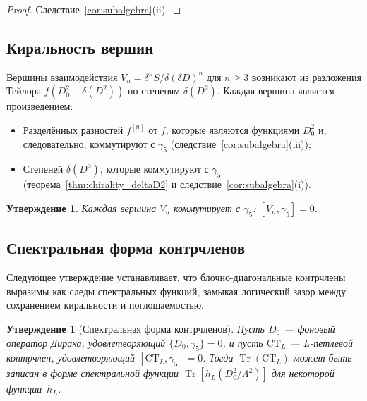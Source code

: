 \documentclass[12pt,a4paper]{article}
\newtheorem{proposition}[theorem]{Утверждение}
\theoremstyle{definition}
\theoremstyle{remark}
\newcommand{\Tr}{\operatorname{Tr}}
\newcommand{\Lam}{\Lambda}
\begin{document}
\begin{proof}
Следствие~\ref{cor:subalgebra}(ii).
\end{proof}

\subsection{Киральность вершин}

Вершины взаимодействия $V_n = \delta^n S / \delta(\delta D)^n$ для
$n \geq 3$ возникают из разложения Тейлора
$f(D_0^2 + \delta(D^2))$ по степеням $\delta(D^2)$.  Каждая вершина
является произведением:
\begin{itemize}
  \item Разделённых разностей $f^{[n]}$ от $f$, которые являются
        функциями $D_0^2$ и, следовательно, коммутируют с $\gamma_5$
        (следствие~\ref{cor:subalgebra}(iii));
  \item Степеней $\delta(D^2)$, которые коммутируют с $\gamma_5$
        (теорема~\ref{thm:chirality_deltaD2} и
        следствие~\ref{cor:subalgebra}(i)).
\end{itemize}

\begin{proposition}\label{prop:vertex_chiral}
Каждая вершина $V_n$ коммутирует с $\gamma_5$: $[V_n, \gamma_5] = 0$.
\end{proposition}

\subsection{Спектральная форма контрчленов}

Следующее утверждение устанавливает, что блочно-диагональные контрчлены
выразимы как следы спектральных функций, замыкая логический зазор между
сохранением киральности и поглощаемостью.

\begin{proposition}[Спектральная форма контрчленов]\label{prop:spectral_form}
Пусть $D_0$ --- фоновый оператор Дирака, удовлетворяющий
$\{D_0, \gamma_5\} = 0$, и пусть $\mathrm{CT}_L$ ---
$L$-петлевой контрчлен, удовлетворяющий
$[\mathrm{CT}_L, \gamma_5] = 0$.  Тогда $\Tr(\mathrm{CT}_L)$ может
быть записан в форме спектральной функции
$\Tr[h_L(D_0^2/\Lam^2)]$ для некоторой функции~$h_L$.
\end{proposition}
\end{document}
